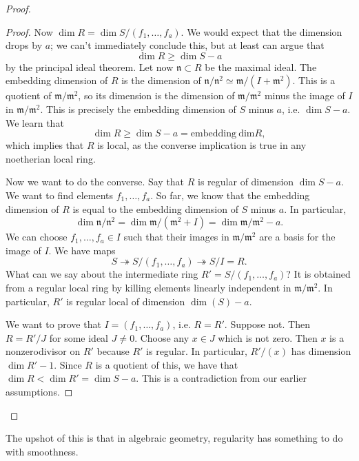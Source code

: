 \begin{proof}
\begin{proof}
Now $\dim R = \dim S/(f_1, \dots, f_a)$. We would expect that the dimension
drops by $a$; we can't immediately conclude this, but at least can argue that
\[ \dim R \geq \dim S - a  \]
by the principal ideal theorem. Let now $\mathfrak{n} \subset R$ be the maximal
ideal. The embedding dimension of $R$ is the dimension of
$\mathfrak{n}/\mathfrak{n}^2 \simeq \mathfrak{m}/(I + \mathfrak{m}^2)$. This is
a quotient of $\mathfrak{m}/\mathfrak{m}^2$, so its dimension is the dimension
of $\mathfrak{m}/\mathfrak{m}^2$ minus the image of $I$ in
$\mathfrak{m}/\mathfrak{m}^2$. This is precisely the embedding dimension of $S$
minus $a$, i.e. $\dim S - a$. We learn that
\[ \dim R \geq \dim S - a = \mathrm{embedding \ dim} R,  \]
which implies that $R$ is local, as the converse implication is true in any
noetherian local ring.

Now we want to do the converse. Say that $R$ is regular of dimension $\dim S
-a$. We want to find elements $f_1, \dots, f_a$.
So far, we know that the embedding dimension of $R$ is equal to the embedding
dimension of $S$ minus $a$. In particular,
\[ \dim \mathfrak{n}/\mathfrak{n}^2 = \dim \mathfrak{m}/(\mathfrak{m}^2+I) =
\dim \mathfrak{m}/\mathfrak{m}^2 - a.  \]
We can choose $f_1, \dots, f_a \in I$ such that their images in
$\mathfrak{m}/\mathfrak{m}^2$ are a basis for  the image of $I$. 
We have maps
\[ S \twoheadrightarrow S/(f_1, \dots, f_a) \twoheadrightarrow S/I = R.  \]
What can we say about the intermediate ring $R'=S/(f_1, \dots, f_a)$? It is
obtained from a regular local ring by killing elements linearly independent in
$\mathfrak{m}/\mathfrak{m}^2$. In particular, $R'$ is regular local of
dimension $\dim (S) -a$. 

We want to prove that $I = (f_1, \dots, f_a)$, i.e. $R = R'$. Suppose not. Then
$R  = R'/J$ for some ideal $J \neq 0$. Choose any $x \in J$ which is not zero.
Then $x$ is  a nonzerodivisor on $R'$ because $R'$ is regular. In particular, $R'/(x)$ has dimension
$\dim R' -1$. Since $R$ is a quotient of this, we have that $\dim R < \dim R' =
\dim S -a$. This is a contradiction from our earlier assumptions.
\end{proof} 
\end{proof} 


The upshot of this is that in algebraic geometry, regularity has something to
do with smoothness. 

